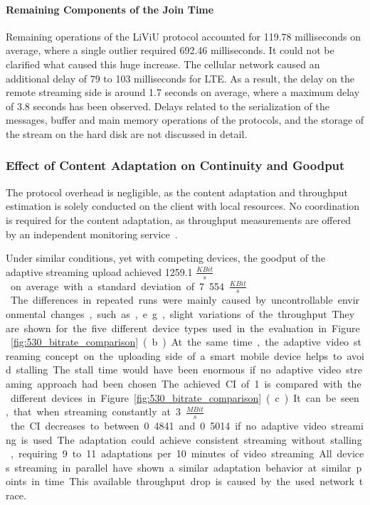 \paragraph{Remaining Components of the Join Time}
Remaining operations of the \ac{LiViU} protocol accounted for 119.78 milliseconds on average, where a single outlier required 692.46 milliseconds.
It could not be clarified what caused this huge increase.
The cellular network caused an additional delay of 79 to 103 milliseconds for \ac{LTE}.
As a result, the delay on the remote streaming side is around 1.7 seconds on average, where a maximum delay of 3.8 seconds has been observed.
Delays related to the serialization of the messages, buffer and main memory operations of the protocols, and  the storage of the stream on the hard disk are not discussed in detail.
\subsubsection{Effect of Content Adaptation on Continuity and Goodput}
The protocol overhead is negligible, as the content adaptation and throughput estimation is solely conducted on the client with local resources.
No coordination is required for the content adaptation, as throughput measurements are offered by an independent monitoring service~\cite{Stohr2014,Stohr2016}.

Under similar conditions, yet with competing devices, the goodput of the adaptive streaming upload achieved 1259.1 \unit{$\frac{KBit}{s}$} on average with a standard deviation of 7.554 \unit{$\frac{KBit}{s}$}.
The differences in repeated runs were mainly caused by uncontrollable environmental changes, such as, e.g., slight variations of the throughput.
They are shown for the five different device types used in the evaluation in Figure~\ref{fig:530_bitrate_comparison} (b).

At the same time, the adaptive video streaming concept on the uploading side of a smart mobile device helps to avoid stalling.
The stall time would have been enormous if no adaptive video streaming approach had been chosen.
The achieved \ac{CI} of 1 is compared with the different devices in Figure~\ref{fig:530_bitrate_comparison} (c).
It can be seen, that when streaming constantly at 3 \unit{$\frac{MBit}{s}$} the \ac{CI} decreases to between 0.4841 and 0.5014 if no adaptive video streaming is used.

The adaptation could achieve consistent streaming without stalling, requiring 9 to 11 adaptations per 10 minutes of video streaming.
All devices streaming in parallel have shown a similar adaptation behavior at similar points in time.
This available throughput drop is caused by the used network trace.
